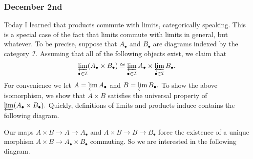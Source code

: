 \subsubsection{December 2nd}
Today I learned that products commute with limits, categorically speaking. This is a special case of the fact that limits commute with limits in general, but whatever. To be precise, suppose that $A_\bullet$ and $B_\bullet$ are diagrams indexed by the category $\mathcal I.$ Assuming that all of the following objects exist, we claim that
\[\varprojlim_{\bullet\in\mathcal I}(A_\bullet\times B_\bullet)\cong\varprojlim_{\bullet\in\mathcal I}A_\bullet\times\varprojlim_{\bullet\in\mathcal I}B_\bullet.\]
For convenience we let $A=\varprojlim A_\bullet$ and $B=\varprojlim B_\bullet.$ To show the above isomorphism, we show that $A\times B$ satisfies the universal property of $\varprojlim(A_\bullet\times B_\bullet).$ Quickly, definitions of limits and products induce contains the following diagram.
\begin{center}
\end{center}
Our maps $A\times B\to A\to A_\bullet$ and $A\times B\to B\to B_\bullet$ force the existence of a unique morphism $A\times B\to A_\bullet\times B_\bullet$ commuting. So we are interested in the following diagram.
\begin{center}
\end{center}

